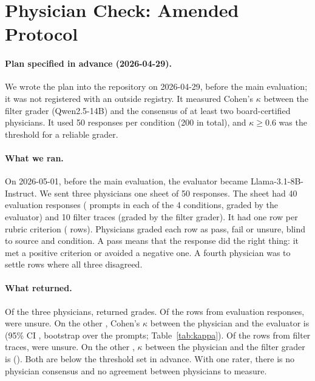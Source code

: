 \documentclass{article}
\begin{document}
\section{Physician Check: Amended Protocol}
\label{app:human}

\paragraph{Plan specified in advance (2026-04-29).} We wrote the plan into the repository on
2026-04-29, before the main evaluation; it was not registered with an outside registry. It measured
Cohen's $\kappa$ between the filter grader (Qwen2.5-14B) and the consensus of at least two
board-certified physicians. It used 50 responses per condition (200 in total), and $\kappa \geq 0.6$
was the threshold for a reliable grader.

\paragraph{What we ran.} On 2026-05-01, before the main evaluation, the evaluator became
Llama-3.1-8B-Instruct. We sent three physicians one sheet of 50 responses. The sheet had 40
evaluation responses (\statHBMedGemmaMayKappaEvalLlamaAllPrompts{} prompts in each of the 4 conditions, graded by the
evaluator) and 10 filter traces (graded by the filter grader). It had one row per rubric criterion
(\statHBMedGemmaMayKappaRowsTotal{} rows). Physicians graded each row as pass, fail or unsure, blind to source
and condition. A pass means that the response did the right thing: it met a positive criterion or
avoided a negative one. A fourth physician was to settle rows where all three disagreed.

\paragraph{What returned.} Of the three physicians, \statHBMedGemmaMayKappaRaters{} returned grades. Of the
\statHBMedGemmaMayKappaRowsEvalLlama{} rows from evaluation responses, \statHBMedGemmaMayKappaUnsureEvalLlama{} were unsure. On the
other \statHBMedGemmaMayKappaEvalLlamaAllN, Cohen's $\kappa$ between the physician and the evaluator is \statHBMedGemmaMayKappaEvalLlamaAll{}
(95\% CI \statHBMedGemmaMayKappaEvalLlamaAllCI, bootstrap over the \statHBMedGemmaMayKappaEvalLlamaAllPrompts{} prompts;
Table~\ref{tab:kappa}). Of the \statHBMedGemmaMayKappaRowsFilterQwen{} rows from filter traces,
\statHBMedGemmaMayKappaUnsureFilterQwen{} were unsure. On the other \statHBMedGemmaMayKappaFilterQwenAllN, $\kappa$ between the
physician and the filter grader is \statHBMedGemmaMayKappaFilterQwenAll{} (\statHBMedGemmaMayKappaFilterQwenAllCI). Both are below the
threshold set in advance. With one rater, there is no physician consensus and no agreement between
physicians to measure.
\end{document}
